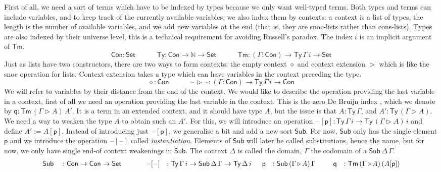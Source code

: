 \documentclass[submission,copyright,creativecommons]{eptcs}
\newcommand{\ra}{\rightarrow}
\newcommand{\Set}{\mathsf{Set}}
\newcommand{\Ty}{\mathsf{Ty}}
\newcommand{\Tm}{\mathsf{Tm}}
\newcommand{\Con}{\mathsf{Con}}
\newcommand{\Sub}{\mathsf{Sub}}
\newcommand{\p}{\mathsf{p}}
\newcommand{\q}{\mathsf{q}}
\newcommand{\ext}{\mathop{\triangleright}}
\newcommand{\N}{\mathbb{N}}
\newcommand{\blank}{\mathord{\hspace{1pt}\text{--}\hspace{1pt}}} %
\begin{document}
First of all, we need a sort of terms which have to be indexed by
types because we only want well-typed terms. Both types and terms can
include variables, and to keep track of the currently available
variables, we also index them by contexts: a context is a list of
types, the length is the number of available variables, and we add new
variables at the end (that is, they are snoc-lists rather than
cons-lists). Types are also indexed by their universe level, this is a
technical requirement for avoiding Russell's paradox. The index $i$ is
an implicit argument of $\Tm$.
\begin{equation*}
\Con : \Set \hspace{3em} 
\Ty : \Con\ra\N\ra\Set \hspace{3em} 
\Tm : (\Gamma:\Con)\ra\Ty\,\Gamma\,i\ra\Set
\end{equation*}
Just as lists have two constructors, there are two ways to form
contexts: the empty context $\diamond$ and context extension $\ext$
which is like the snoc operation for lists. Context extension takes a
type which can have variables in the context preceding the type.
\[
\diamond : \Con \hspace{3em}
\blank\ext\blank : (\Gamma:\Con)\ra\Ty\,\Gamma\,i\ra\Con
\]
We will refer to variables by their distance from the end of the
context. We would like to describe the operation providing the last
variable in a context, first of all we need an operation providing the last
variable in the context. This is the zero De Bruijn index \cite{debruijn}, which we
denote by $\q : \Tm\,(\Gamma\ext A)\,A'$. It is a term in an
extended context, and it should have type $A$, but the issue is that
$A : \Ty\,\Gamma$, and $A' : \Ty\,(\Gamma\ext A)$. We need a way to
weaken the type $A$ to obtain such an $A'$. For this, we will
introduce an operation $\blank[\p] : \Ty\,\Gamma\,i\ra\Ty\,(\Gamma\ext
A)\,i$ and define $A' := A[\p]$. Instead of introducing just
$\blank[\p]$, we generalise a bit and add a new sort $\Sub$. For
now, $\Sub$ only has the single element $\p$ and we introduce the operation
$\blank[\blank]$ called \emph{instantiation}. Elements of $\Sub$
will later be called substitutions, hence the name, but for now, we
only have single end-of context weakenings in $\Sub$. The context
$\Delta$ is called the domain, $\Gamma$ the codomain of a
$\Sub\,\Delta\,\Gamma$.
\begin{alignat*}{10}
  & \Sub && : \Con\ra\Con\ra\Set &&\hspace{1.5em}
  & \blank[\blank] && : \Ty\,\Gamma\,i\ra\Sub\,\Delta\,\Gamma\ra\Ty\,\Delta\,i \hspace{1.5em}
  \p && : \Sub\,(\Gamma\ext A)\,\Gamma \hspace{1.5em}
  && \q && : \Tm\,(\Gamma\ext A)\,(A[\p])
\end{alignat*}
\end{document}
